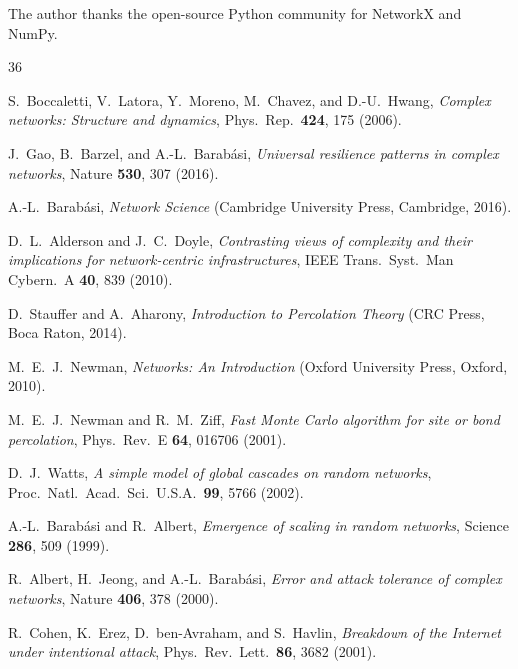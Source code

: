 \documentclass[aps,pre,twocolumn,superscriptaddress,showpacs]{revtex4-2}
\begin{document}
\begin{acknowledgments}
The author thanks the open-source Python community for NetworkX and NumPy.
\end{acknowledgments}

\begin{thebibliography}{36}

S.~Boccaletti, V.~Latora, Y.~Moreno, M.~Chavez, and D.-U.~Hwang,
\emph{Complex networks: Structure and dynamics},
Phys.\ Rep.\ \textbf{424}, 175 (2006).

J.~Gao, B.~Barzel, and A.-L.~Barab\'asi,
\emph{Universal resilience patterns in complex networks},
Nature \textbf{530}, 307 (2016).

A.-L.~Barab\'asi,
\emph{Network Science} (Cambridge University Press, Cambridge, 2016).

D.~L.~Alderson and J.~C.~Doyle,
\emph{Contrasting views of complexity and their implications for network-centric infrastructures},
IEEE Trans.\ Syst.\ Man Cybern.\ A \textbf{40}, 839 (2010).

D.~Stauffer and A.~Aharony,
\emph{Introduction to Percolation Theory} (CRC Press, Boca Raton, 2014).

M.~E.~J.~Newman,
\emph{Networks: An Introduction} (Oxford University Press, Oxford, 2010).

M.~E.~J.~Newman and R.~M.~Ziff,
\emph{Fast Monte Carlo algorithm for site or bond percolation},
Phys.\ Rev.\ E \textbf{64}, 016706 (2001).

D.~J.~Watts,
\emph{A simple model of global cascades on random networks},
Proc.\ Natl.\ Acad.\ Sci.\ U.S.A.\ \textbf{99}, 5766 (2002).

A.-L.~Barab\'asi and R.~Albert,
\emph{Emergence of scaling in random networks},
Science \textbf{286}, 509 (1999).

R.~Albert, H.~Jeong, and A.-L.~Barab\'asi,
\emph{Error and attack tolerance of complex networks},
Nature \textbf{406}, 378 (2000).

R.~Cohen, K.~Erez, D.~ben-Avraham, and S.~Havlin,
\emph{Breakdown of the Internet under intentional attack},
Phys.\ Rev.\ Lett.\ \textbf{86}, 3682 (2001).


\end{thebibliography}
\end{document}
